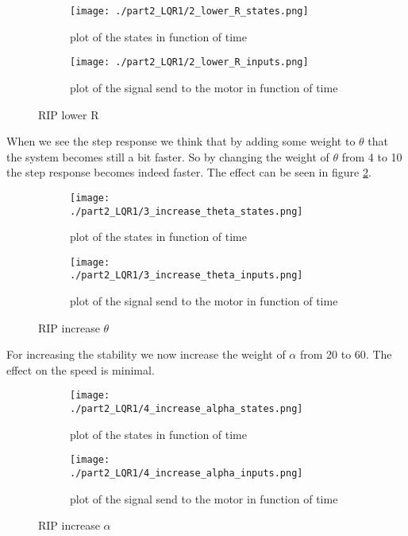 \begin{figure}[H]
	\centering
	\begin{subfigure}[b]{0.45\textwidth}
		\texttt{[image: ./part2\_LQR1/2\_lower\_R\_states.png]}
		\caption{plot of the states in function of time}
	\end{subfigure}
	\begin{subfigure}[b]{0.45\textwidth}
		\texttt{[image: ./part2\_LQR1/2\_lower\_R\_inputs.png]}
		\caption{plot of the signal send to the motor in function of time}
	\end{subfigure}
	\caption{RIP lower R}
	\label{fig:lowR}
\end{figure}

When we see the step response we think that by adding some weight to $\theta$ that the system becomes still a bit faster. So by changing the weight of $\theta$ from 4 to 10 the step response becomes indeed faster. The effect can be seen in figure \ref{fig:heighT}.

\begin{figure}[H]
	\centering
	\begin{subfigure}[b]{0.45\textwidth}
		\texttt{[image: ./part2\_LQR1/3\_increase\_theta\_states.png]}
		\caption{plot of the states in function of time}
	\end{subfigure}
	\begin{subfigure}[b]{0.45\textwidth}
		\texttt{[image: ./part2\_LQR1/3\_increase\_theta\_inputs.png]}
		\caption{plot of the signal send to the motor in function of time}
	\end{subfigure}
	\caption{RIP increase $\theta$}
	\label{fig:heighT}
\end{figure}

For increasing the stability we now increase the weight of $\alpha$ from 20 to 60. The effect on the speed is minimal.

\begin{figure}[H]
	\centering
	\begin{subfigure}[b]{0.45\textwidth}
		\texttt{[image: ./part2\_LQR1/4\_increase\_alpha\_states.png]}
		\caption{plot of the states in function of time}
	\end{subfigure}
	\begin{subfigure}[b]{0.45\textwidth}
		\texttt{[image: ./part2\_LQR1/4\_increase\_alpha\_inputs.png]}
		\caption{plot of the signal send to the motor in function of time}
	\end{subfigure}
	\caption{RIP increase $\alpha$}
\end{figure}

